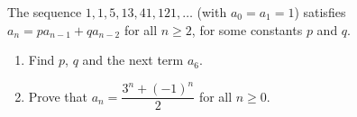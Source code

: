 The sequence $1,1,5,13,41,121,\dots$ (with $a_0=a_1=1$) satisfies $a_n=pa_{n-1}+qa_{n-2}$ for all $n\ge2$, for some constants $p$ and $q$.
\begin{enumerate}
\item[(a)] Find $p$, $q$ and the next term $a_6$.
\item[(b)] Prove that $a_n=\dfrac{3^n+(-1)^n}{2}$ for all $n\ge0$.
\end{enumerate}
